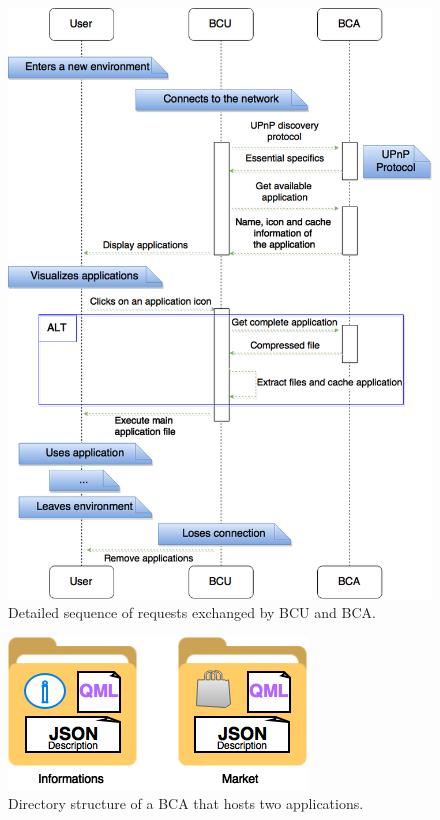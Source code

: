 \documentclass[journal]{IEEEtran}
\begin{document}
\begin{figure}[!htb]
    \includegraphics[scale = 0.24]{FIG4}
    \caption{Detailed sequence of requests exchanged by BCU and BCA.}
\end{figure}

\begin{figure}[!htb]
    \includegraphics[scale = 0.83]{FIG3}
    \caption{Directory structure of a BCA that hosts two applications.}
\end{figure}
\end{document}
